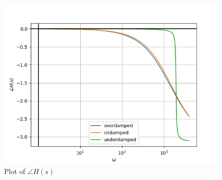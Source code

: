 \begin{enumerate}[label=\thechapter.\arabic*,ref=\thechapter.\theenumi]
\begin{figure}[!ht]
    \centering
    \includegraphics[width=\columnwidth]{app/figs/angle_H_s.png}
    \caption{Plot of $\angle H(s)$}
\end{figure}

\end{enumerate}
